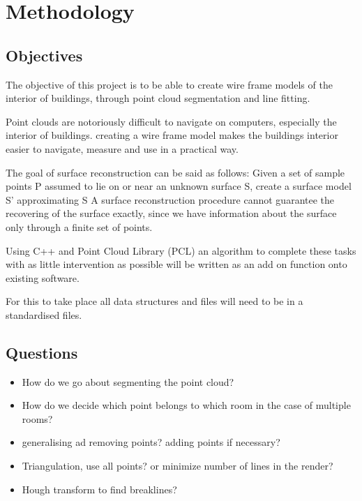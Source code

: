 



\section{Methodology}

\subsection{Objectives}

The objective of this project is to be able to create wire frame models of the interior of buildings, through point cloud segmentation and line fitting. %

Point clouds are notoriously difficult to navigate on computers, especially the interior of buildings. creating a wire frame model makes the buildings interior easier to navigate, measure and use in a practical way.

The goal of surface reconstruction can be said as follows: Given a set of sample points P assumed to lie on or near an unknown surface S, create a surface model S' approximating S
A surface reconstruction procedure cannot guarantee the recovering of the surface exactly, since we have information about the surface only through a finite set of points.

Using C++ and Point Cloud Library (PCL) an algorithm to complete these tasks with as little intervention as possible will be written as an add on function onto existing software.

For this to take place all data structures and files will need to be in a standardised files.


\subsection{Questions}
\begin{itemize}

\item How do we go about segmenting the point cloud?

\item How do we decide which point belongs to which room in the case of multiple rooms?

\item generalising ad removing points? adding points if necessary?

\item Triangulation, use all points? or minimize number of lines in the render?

\item Hough transform to find breaklines? 

\end{itemize}


